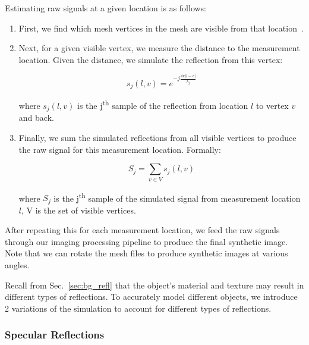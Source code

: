 Estimating raw signals at a given location is as follows:
\begin{enumerate}
    \item First, we find which mesh vertices in the mesh are visible from that location~\cite{mesh_visibility}.
    \item Next, for a given visible vertex, we measure the distance to the measurement location. Given the distance, we simulate the reflection from this vertex: 

    
    \vspace{-0.1pt}
    { \eqsize
    \begin{equation} \label{eq:single_sim}
        s_j(l,v) = e^{-j \frac{4 \pi |l-v|}{\lambda_j}}
    \end{equation}
    }
    
    \noindent where $s_j(l,v)$ is the j\textsuperscript{th} sample of the reflection from  location $l$ to vertex $v$ and back. 
    \item Finally, we sum the simulated reflections from all visible vertices to produce the raw signal for this measurement location. Formally: 

    
    \vspace{-0.1pt}
    { \eqsize
    \begin{equation} 
    \label{eq:sum_sim}
        S_j = \sum_{v\in V} s_j(l,v)
    \end{equation}
    }
    
    \noindent where $S_j$ is the j\textsuperscript{th} sample of the simulated signal from measurement location $l$, V is the set of visible vertices.
\end{enumerate}

\noindent After repeating this for each measurement location, we feed the raw signals through our imaging processing pipeline to produce the final synthetic image. Note that we can rotate the mesh files to produce synthetic images at various angles.


Recall from Sec.~\ref{sec:bg_refl} that the object's material and texture may result in different types of reflections. To accurately model different objects, we introduce 2 variations of the simulation to account for different types of reflections. 


\vspace{-0.1pt}
\subsubsection{Specular Reflections}
\vspace{-0.1pt}

